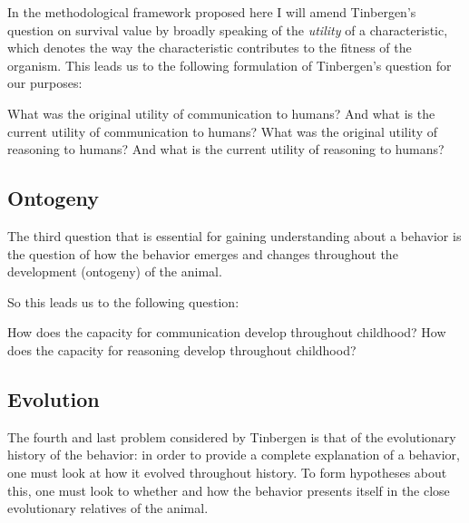 In the methodological framework proposed here I will amend Tinbergen's question on survival value by broadly speaking of the \emph{utility} of a characteristic, which denotes the way the characteristic contributes to the fitness of the organism.
This leads us to the following formulation of Tinbergen's question for our purposes:

\begin{exe}
    \ex
    \begin{xlist}
        \ex
        What was the original utility of communication to humans? And what is the current utility of communication to humans?
        \ex
        What was the original utility of reasoning to humans? And what is the current utility of reasoning to humans?
    \end{xlist}
\end{exe}

\subsection{Ontogeny}
The third question that is essential for gaining understanding about a behavior is the question of how the behavior emerges and changes throughout the development (ontogeny) of the animal.

So this leads us to the following question:
\begin{exe}
    \ex
    \begin{xlist}
        \ex How does the capacity for communication develop throughout childhood?
        \ex How does the capacity for reasoning develop throughout childhood?
    \end{xlist}
\end{exe}

\subsection{Evolution}
The fourth and last problem considered by Tinbergen is that of the evolutionary history of the behavior: in order to provide a complete explanation of a behavior, one must look at how it evolved throughout history. To form hypotheses about this, one must look to whether and how the behavior presents itself in the close evolutionary relatives of the animal.


